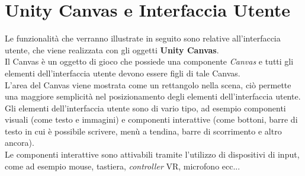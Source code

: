 \section{Unity Canvas e Interfaccia Utente}
Le funzionalità che verranno illustrate in seguito sono relative all'interfaccia utente, che viene realizzata con gli oggetti \textbf{Unity Canvas}.
\\Il Canvas è un oggetto di gioco che possiede una componente \textit{Canvas} e tutti gli elementi dell'interfaccia utente devono essere figli di tale Canvas.
\\L'area del Canvas viene mostrata come un rettangolo nella scena, ciò permette una maggiore semplicità nel posizionamento degli elementi dell'interfaccia utente.
\\Gli elementi dell'interfaccia utente sono di vario tipo, ad esempio componenti visuali (come testo e immagini) e componenti interattive (come bottoni, barre di testo in cui è possibile scrivere, menù a tendina, barre di scorrimento e altro ancora).
\\Le componenti interattive sono attivabili tramite l'utilizzo di dispositivi di input, come ad esempio mouse, tastiera, \textit{controller} VR, microfono ecc...
